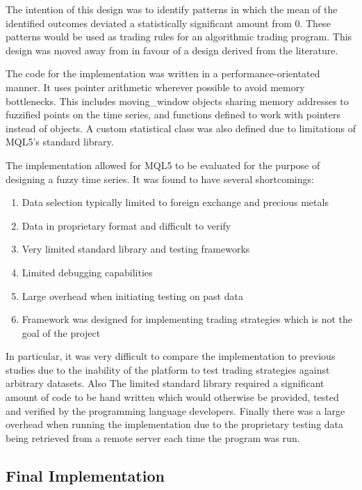 \documentclass[12pt]{article}
\theoremstyle{definition}
\begin{document}
The intention of this design was to identify patterns in which the mean of the identified outcomes deviated a statistically significant amount from 0. These patterns would be used as trading rules for an algorithmic trading program. This design was moved away from in favour of a design derived from the literature.

The code for the implementation was written in a performance-orientated manner. It uses pointer arithmetic wherever possible to avoid memory bottlenecks. This includes moving\_window objects sharing memory addresses to fuzzified points on the time series, and functions defined to work with pointers instead of objects. A custom statistical class was also defined due to limitations of MQL5's standard library.

The implementation allowed for MQL5 to be evaluated for the purpose of designing a fuzzy time series. It was found to have several shortcomings:

\begin{enumerate}[label=\roman*]
\label{mql5}
\item Data selection typically limited to foreign exchange and precious metals
\item Data in proprietary format and difficult to verify
\item Very limited standard library and testing frameworks
\item Limited debugging capabilities
\item Large overhead when initiating testing on past data
\item Framework was designed for implementing trading strategies which is not the goal of the project
\end{enumerate}

In particular, it was very difficult to compare the implementation to previous studies due to the inability of the platform to test trading strategies against arbitrary datasets. Also The limited standard library required a significant amount of code to be hand written which would otherwise be provided, tested and verified by the programming language developers. Finally there was a large overhead when running the implementation due to the proprietary testing data being retrieved from a remote server each time the program was run.

\subsection{Final Implementation}
\end{document}
